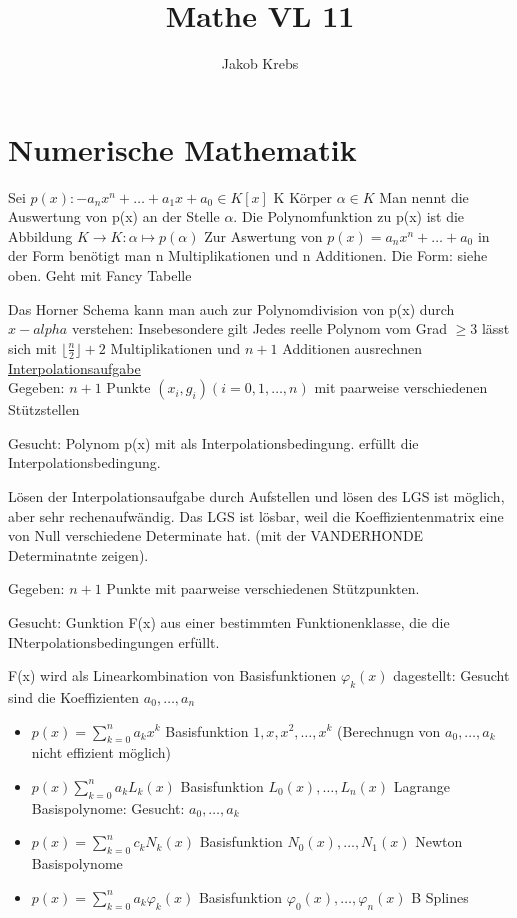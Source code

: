 \documentclass{../tudscript}
\author{Jakob Krebs}
\title{Mathe VL 11}
\begin{document}
\part{Numerische Mathematik}
Sei $p(x):- a_n x^n + \ldots + a_1 x + a_0 \in K[x]$ K Körper $\alpha \in K$
Man nennt
die Auswertung von p(x) an der Stelle $\alpha$. Die Polynomfunktion zu p(x) ist die Abbildung $K \rightarrow K: \alpha \mapsto p(\alpha)$
Zur Aswertung von $p(x) = a_n x^n + \ldots + a_0$ in der Form
benötigt man n Multiplikationen und n Additionen.
Die Form: siehe oben. Geht mit Fancy Tabelle

Das Horner Schema kann man auch zur Polynomdivision von p(x) durch $x -alpha$
verstehen:
Insebesondere gilt
Jedes reelle Polynom vom Grad $\geq 3$ lässt sich mit $\lfloor \frac{n}{2} \rfloor + 2$ Multiplikationen und $n+1$ Additionen ausrechnen 
\underline{Interpolationsaufgabe}\\

Gegeben: $n+1$ Punkte $(x_i, g_i) (i = 0, 1, \ldots, n)$ mit paarweise verschiedenen Stützstellen

Gesucht: Polynom p(x) mit
als Interpolationsbedingung.
erfüllt die Interpolationsbedingung.

Lösen der Interpolationsaufgabe durch Aufstellen und lösen des LGS ist möglich, aber sehr rechenaufwändig.
Das LGS ist lösbar, weil die Koeffizientenmatrix eine von Null verschiedene Determinate hat. (mit der VANDERHONDE Determinatnte zeigen).

Gegeben: $n+1$ Punkte mit paarweise verschiedenen Stützpunkten.

Gesucht: Gunktion F(x) aus einer bestimmten Funktionenklasse, die die INterpolationsbedingungen
erfüllt.

F(x) wird als Linearkombination von Basisfunktionen $\varphi_k (x)$ dagestellt:
Gesucht sind die Koeffizienten $a_0, \ldots, a_n$

\begin{itemize}
\item $p(x) = \sum_{k = 0}^n a_k x^k$ Basisfunktion $1, x, x^2, \ldots, x^k$ (Berechnugn von $a_0, \ldots, a_k$ nicht effizient möglich)
\item $p(x) \sum_{k = 0}^n a_k L_k (x)$ Basisfunktion $L_0(x), \ldots, L_n(x)$ Lagrange Basispolynome: Gesucht: $a_0, \ldots, a_k$
\item $p(x) = \sum_{k = 0}^n c_k N_k (x)$ Basisfunktion $N_0 (x), \ldots, N_1 (x)$ Newton Basispolynome
\item $p(x) = \sum_{k = 0}^n a_k \varphi_k (x)$ Basisfunktion $\varphi_0 (x), \ldots, \varphi_n (x)$ B Splines
\end{itemize}
\end{document}
